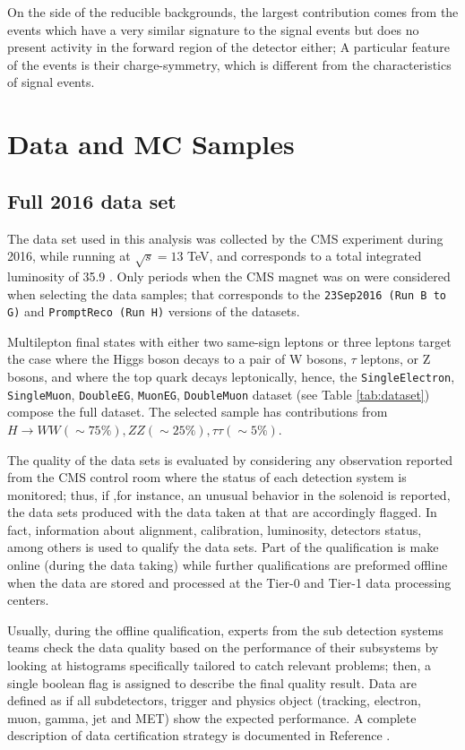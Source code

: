On the side of the reducible backgrounds, the largest contribution comes from the \ttbar events which have a very similar signature to the signal events but does no present activity in the forward region of the detector either; A particular feature of the \ttbar events is their charge-symmetry, which is different from the characteristics of signal events.
\section{Data and MC Samples} \label{secc:samples}

\subsection{ Full 2016 data set}

The data set used in this analysis was collected by the CMS experiment during 2016, while running at $\sqrt{s}=13$ TeV, and corresponds to a total integrated luminosity of 35.9 \fbinv. Only periods when the CMS magnet was on were considered when selecting the data samples; that corresponds to the \verb|23Sep2016 (Run B to G)| and \verb|PromptReco (Run H)| versions of the datasets.

Multilepton final states with either two same-sign leptons or three leptons target the case where the Higgs boson decays to a pair of W bosons, $\tau$ leptons, or Z bosons, and where the top quark decays leptonically, hence, the \verb|SingleElectron|, \verb|SingleMuon|, \verb|DoubleEG|, \verb|MuonEG|, \verb|DoubleMuon| dataset (see Table \ref{tab:dataset}) compose the full dataset. The selected sample has contributions from $H\to WW (\sim 75\%), ZZ (\sim 25\%), \tau\tau (\sim 5\%)$.

The quality of the data sets is evaluated by considering any observation reported from the CMS control room where the status of each detection system is monitored; thus, if ,for instance, an unusual behavior in the solenoid is reported, the data sets produced with the data taken at that are accordingly flagged. In fact, information about alignment, calibration, luminosity, detectors status, among others is used to qualify the data sets. Part of the qualification is make online (during the data taking) while further qualifications are preformed offline when the data are stored and processed at the Tier-0 and Tier-1 data processing centers.

Usually, during the offline qualification, experts from the sub detection systems teams check the data quality based on the performance of their subsystems by looking at histograms specifically tailored to catch relevant problems; then, a single boolean flag is assigned to describe the final quality result. Data are defined as  if all subdetectors, trigger and physics object (tracking, electron, muon, gamma, jet and MET) show the expected performance. A complete description of data certification strategy is documented in Reference \cite{dqm}. 

